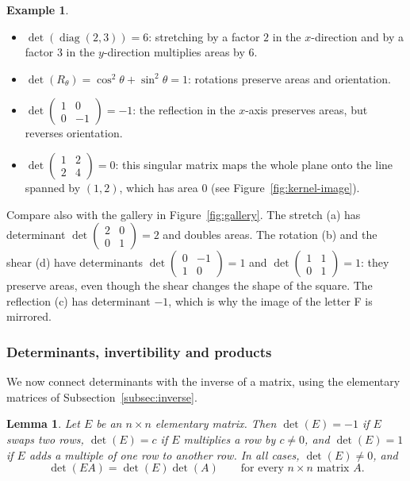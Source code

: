 \documentclass[11pt]{article}
\theoremstyle{definition}
\newtheorem{example}[definition]{Example}
\theoremstyle{plain}
\newtheorem{lemma}[definition]{Lemma}
\theoremstyle{remark}
\DeclareMathOperator{\diag}{diag}
\begin{document}
\begin{example}
    \begin{itemize}
        \item $\det(\diag(2, 3)) = 6$: stretching by a factor $2$ in the $x$-direction and by a factor $3$ in the $y$-direction multiplies areas by $6$.
        \item $\det(R_\theta) = \cos^2\theta + \sin^2\theta = 1$: rotations preserve areas and orientation.
        \item $\det \begin{pmatrix} 1 & 0 \\ 0 & -1 \end{pmatrix} = -1$: the reflection in the $x$-axis preserves areas, but reverses orientation.
        \item $\det \begin{pmatrix} 1 & 2 \\ 2 & 4 \end{pmatrix} = 0$: this singular matrix maps the whole plane onto the line spanned by $(1, 2)$, which has area $0$ (see Figure~\ref{fig:kernel-image}).
    \end{itemize}
    Compare also with the gallery in Figure~\ref{fig:gallery}. The stretch (a) has determinant $\det \begin{pmatrix} 2 & 0 \\ 0 & 1 \end{pmatrix} = 2$ and doubles areas. The rotation (b) and the shear (d) have determinants $\det \begin{pmatrix} 0 & -1 \\ 1 & 0 \end{pmatrix} = 1$ and $\det \begin{pmatrix} 1 & 1 \\ 0 & 1 \end{pmatrix} = 1$: they preserve areas, even though the shear changes the shape of the square. The reflection (c) has determinant $-1$, which is why the image of the letter F is mirrored.
\end{example}

\subsubsection{Determinants, invertibility and products}

We now connect determinants with the inverse of a matrix, using the elementary matrices of Subsection~\ref{subsec:inverse}.

\begin{lemma}\label{lem:det-elementary}
    Let $E$ be an $n \times n$ elementary matrix. Then $\det(E) = -1$ if $E$ swaps two rows, $\det(E) = c$ if $E$ multiplies a row by $c \neq 0$, and $\det(E) = 1$ if $E$ adds a multiple of one row to another row. In all cases, $\det(E) \neq 0$, and
    \[\det(EA) = \det(E) \det(A) \qquad \text{for every } n \times n \text{ matrix } A.\]
\end{lemma}
\end{document}
